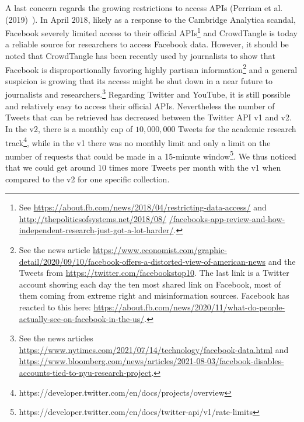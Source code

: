 \documentclass{article}
\begin{document}
A last concern regards the growing restrictions to access APIs (Perriam et al.(2019)~\cite{api}).
In April $2018$, likely as a response to the Cambridge Analytica scandal, Facebook severely limited access to their official APIs\footnote{See \href{https://about.fb.com/news/2018/04/restricting-data-access/}{https://about.fb.com/news/2018/04/restricting-data-access/} and \href{http://thepoliticsofsystems.net/2018/08/facebooks-app-review-and-how-independent-research-just-got-a-lot-harder/}{http://thepoliticsofsystems.net/2018/08/} \href{http://thepoliticsofsystems.net/2018/08/facebooks-app-review-and-how-independent-research-just-got-a-lot-harder/}{/facebooks-app-review-and-how-independent-research-just-got-a-lot-harder/}.} 
and CrowdTangle is today a reliable source for researchers to access Facebook data. 
However, it should be noted that CrowdTangle has been recently used by journalists to show that Facebook is disproportionally favoring highly partisan information\footnote{See the news article \href{https://www.economist.com/graphic-detail/2020/09/10/facebook-offers-a-distorted-view-of-american-news}{https://www.economist.com/graphic-detail/2020/09/10/facebook-offers-a-distorted-view-of-american-news} and the Tweets from \href{https://twitter.com/facebookstop10}{https://twitter.com/facebookstop10}. 
The last link is a Twitter account showing each day the ten most shared link on Facebook, most of them coming from extreme right and misinformation sources. 
Facebook has reacted to this here: \href{https://about.fb.com/news/2020/11/what-do-people-actually-see-on-facebook-in-the-us/}{https://about.fb.com/news/2020/11/what-do-people-actually-see-on-facebook-in-the-us/}.} 
and a general suspicion is growing that its access might be shut down in a near future to journalists and researchers.\footnote{See the news articles \href{https://www.nytimes.com/2021/07/14/technology/facebook-data.html}{https://www.nytimes.com/2021/07/14/technology/facebook-data.html} and \href{https://www.bloomberg.com/news/articles/2021-08-03/facebook-disables-accounts-tied-to-nyu-research-project}{https://www.bloomberg.com/news/articles/2021-08-03/facebook-disables-accounts-tied-to-nyu-research-project}.}
Regarding Twitter and YouTube, it is still possible and relatively easy to access their official APIs. Nevertheless the number of Tweets that can be retrieved has decreased between the Twitter API v1 and v2. 
In the v2, there is a monthly cap of $10,000,000$ Tweets for the academic research track\footnote{https://developer.twitter.com/en/docs/projects/overview},
while in the v1 there was no monthly limit and only a limit on the number of requests that could be made in a 15-minute window\footnote{https://developer.twitter.com/en/docs/twitter-api/v1/rate-limits}.
We thus noticed that we could get around $10$ times more Tweets per month with the v1 when compared to the v2 for one specific collection.
\end{document}
